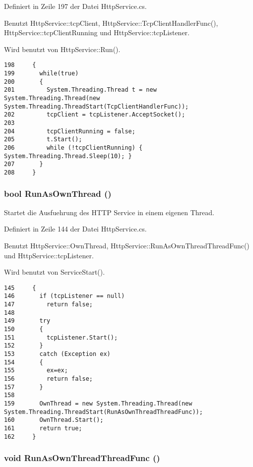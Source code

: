 Definiert in Zeile 197 der Datei Http\-Service.cs.

Benutzt Http\-Service::tcp\-Client, Http\-Service::Tcp\-Client\-Handler\-Func(), Http\-Service::tcp\-Client\-Running und Http\-Service::tcp\-Listener.

Wird benutzt von Http\-Service::Run().



\footnotesize\begin{verbatim}198     {
199       while(true)
200       {
201         System.Threading.Thread t = new System.Threading.Thread(new System.Threading.ThreadStart(TcpClientHandlerFunc));
202         tcpClient = tcpListener.AcceptSocket();
203 
204         tcpClientRunning = false;
205         t.Start();
206         while (!tcpClientRunning) { System.Threading.Thread.Sleep(10); }
207       }
208     }
\end{verbatim}\normalsize 
\hypertarget{classQbeSAS_1_1HttpService_QbeSAS_1_1HttpServicea1}{
\subsubsection[RunAsOwnThread]{\setlength{\rightskip}{0pt plus 5cm}bool Run\-As\-Own\-Thread ()}}
\label{classQbeSAS_1_1HttpService_QbeSAS_1_1HttpServicea1}


Startet die Ausfuehrung des HTTP Service in einem eigenen Thread. 



Definiert in Zeile 144 der Datei Http\-Service.cs.

Benutzt Http\-Service::Own\-Thread, Http\-Service::Run\-As\-Own\-Thread\-Thread\-Func() und Http\-Service::tcp\-Listener.

Wird benutzt von Service\-Start().



\footnotesize\begin{verbatim}145     {
146       if (tcpListener == null)
147         return false;
148 
149       try 
150       {
151         tcpListener.Start();
152       }
153       catch (Exception ex) 
154       {
155         ex=ex;
156         return false;
157       }
158 
159       OwnThread = new System.Threading.Thread(new System.Threading.ThreadStart(RunAsOwnThreadThreadFunc));
160       OwnThread.Start();
161       return true;
162     }
\end{verbatim}\normalsize 
\hypertarget{classQbeSAS_1_1HttpService_QbeSAS_1_1HttpServiced0}{
\subsubsection[RunAsOwnThreadThreadFunc]{\setlength{\rightskip}{0pt plus 5cm}void Run\-As\-Own\-Thread\-Thread\-Func ()}}
\label{classQbeSAS_1_1HttpService_QbeSAS_1_1HttpServiced0}




